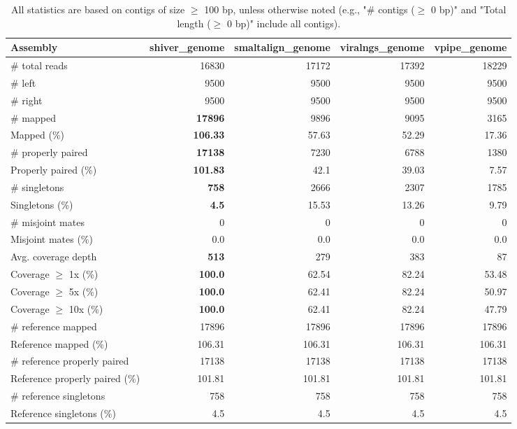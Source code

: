 \documentclass[12pt,a4paper]{article}
\begin{document}
\begin{table}[ht]
\begin{center}
\caption{All statistics are based on contigs of size $\geq$ 100 bp, unless otherwise noted (e.g., "\# contigs ($\geq$ 0 bp)" and "Total length ($\geq$ 0 bp)" include all contigs).}
\begin{tabular}{|l*{4}{|r}|}
\hline
Assembly & shiver\_genome & smaltalign\_genome & viralngs\_genome & vpipe\_genome \\ \hline
\# total reads & 16830 & 17172 & 17392 & 18229 \\ \hline
\# left & 9500 & 9500 & 9500 & 9500 \\ \hline
\# right & 9500 & 9500 & 9500 & 9500 \\ \hline
\# mapped & {\bf 17896} & 9896 & 9095 & 3165 \\ \hline
Mapped (\%) & {\bf 106.33} & 57.63 & 52.29 & 17.36 \\ \hline
\# properly paired & {\bf 17138} & 7230 & 6788 & 1380 \\ \hline
Properly paired (\%) & {\bf 101.83} & 42.1 & 39.03 & 7.57 \\ \hline
\# singletons & {\bf 758} & 2666 & 2307 & 1785 \\ \hline
Singletons (\%) & {\bf 4.5} & 15.53 & 13.26 & 9.79 \\ \hline
\# misjoint mates & 0 & 0 & 0 & 0 \\ \hline
Misjoint mates (\%) & 0.0 & 0.0 & 0.0 & 0.0 \\ \hline
Avg. coverage depth & {\bf 513} & 279 & 383 & 87 \\ \hline
Coverage $\geq$ 1x (\%) & {\bf 100.0} & 62.54 & 82.24 & 53.48 \\ \hline
Coverage $\geq$ 5x (\%) & {\bf 100.0} & 62.41 & 82.24 & 50.97 \\ \hline
Coverage $\geq$ 10x (\%) & {\bf 100.0} & 62.41 & 82.24 & 47.79 \\ \hline
\# reference mapped & 17896 & 17896 & 17896 & 17896 \\ \hline
Reference mapped (\%) & 106.31 & 106.31 & 106.31 & 106.31 \\ \hline
\# reference properly paired & 17138 & 17138 & 17138 & 17138 \\ \hline
Reference properly paired (\%) & 101.81 & 101.81 & 101.81 & 101.81 \\ \hline
\# reference singletons & 758 & 758 & 758 & 758 \\ \hline
Reference singletons (\%) & 4.5 & 4.5 & 4.5 & 4.5 \\ \hline

\end{tabular}
\end{center}
\end{table}
\end{document}
